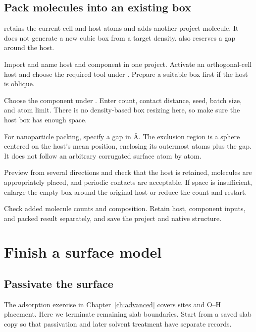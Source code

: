 \subsection{Pack molecules into an existing box}\label{sec:host-packing-reference}

 retains the current cell and host atoms and adds another project molecule. It does not generate a new cubic box from a target density.  also reserves a gap around the host.

\begin{steps}
  \item Import and name host and component in one project. Activate an orthogonal-cell host and choose the required tool under . Prepare a suitable box first if the host is oblique.
  \item Choose the component under . Enter count, contact distance, seed, batch size, and atom limit. There is no density-based box resizing here, so make sure the host box has enough space.
  \item For nanoparticle packing, specify a gap in \AA. The exclusion region is a sphere centered on the host's mean position, enclosing its outermost atoms plus the gap. It does not follow an arbitrary corrugated surface atom by atom.
  \item Preview from several directions and check that the host is retained, molecules are appropriately placed, and periodic contacts are acceptable. If space is insufficient, enlarge the empty box around the original host or reduce the count and restart.
  \item Check added molecule counts and composition. Retain host, component inputs, and packed result separately, and save the project and native structure.
\end{steps}

\section{Finish a surface model}

\subsection{Passivate the surface}\label{sec:surface-finishing-reference}

The adsorption exercise in Chapter~\ref{ch:advanced} covers sites and O--H placement. Here we terminate remaining slab boundaries. Start from a saved slab copy so that passivation and later solvent treatment have separate records.

